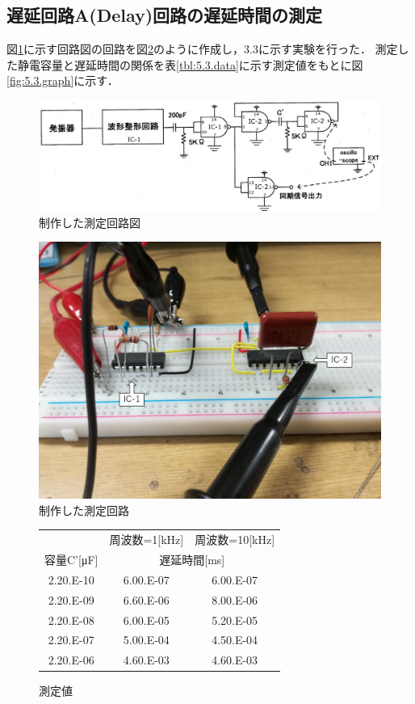 \documentclass[10pt, a4j, dvipdfmx]{jarticle}
\makeatletter
\newcommand{\tblcaption}[1]{\def\@captype{table}\caption{#1}}
\makeatother
\begin{document}
\subsection{遅延回路A(Delay)回路の遅延時間の測定}
図\ref{fig:5.3.circuit}に示す回路図の回路を図\ref{fig:5.3.camera}のように作成し，3.3に示す実験を行った．
測定した静電容量と遅延時間の関係を表\ref{tbl:5.3.data}に示す測定値をもとに図\ref{fig:5.3.graph}に示す．
\begin{figure}[H]
	\centering
	\includegraphics[width=\hsize]{images/Experiment/5_3_circuit.png}
	\caption{制作した測定回路図}
	\label{fig:5.3.circuit}
\end{figure}
\begin{figure}[H]
    \centering
	\includegraphics[width=\hsize]{images/camera/5_3_camera.png}
    \caption{制作した測定回路}
	\label{fig:5.3.camera}
\end{figure}
\begin{figure}[H]
	\centering
	\tblcaption{測定値}
	\label{}
	\begin{tabular}{|c|c|c|}\hline
		 & 周波数=1[kHz] & 周波数=10[kHz] \\\cline{2-3}
		容量C'[μF] & \multicolumn{2}{|c|}{遅延時間[ms]}   \\\hline
		2.20.E-10 & 6.00.E-07 & 6.00.E-07 \\\hline
		2.20.E-09 & 6.60.E-06 & 8.00.E-06 \\\hline
		2.20.E-08 & 6.00.E-05 & 5.20.E-05 \\\hline
		2.20.E-07 & 5.00.E-04 & 4.50.E-04 \\\hline
		2.20.E-06 & 4.60.E-03 & 4.60.E-03 \\\hline
	\end{tabular}
\end{figure}
\end{document}
